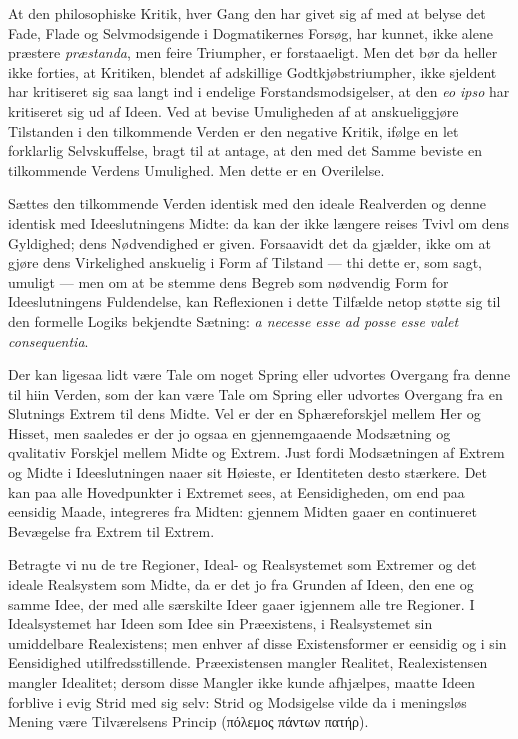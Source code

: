 \documentclass[12pt]{book}
\newcommand{\opage}[1]{\marginnote{\footnotesize\textit{[#1]}}}
\begin{document}
At den philosophiske Kritik, hver Gang den har givet sig af med at belyse det Fade, Flade og Selvmodsigende i Dogmatikernes Forsøg, har kunnet, ikke alene præstere \textit{præstanda}, men feire Triumpher, er forstaaeligt. Men det bør da heller ikke forties, at Kritiken, blendet af adskillige Godtkjøbstriumpher, ikke sjeldent har kritiseret sig saa langt ind i endelige Forstandsmodsigelser, at den \textit{eo ipso} har kritiseret sig ud af Ideen. Ved at bevise Umuligheden af at anskueliggjøre Tilstanden i den tilkommende Verden er den negative Kritik, ifølge en let forklarlig Selvskuffelse, bragt til at antage, at den med det Samme beviste en tilkommende Verdens Umulighed. Men dette er en Overilelse.

Sættes den tilkommende Verden identisk med den ideale Realverden og denne identisk med Ideeslutningens Midte: da kan der ikke længere reises Tvivl om dens Gyldighed; dens Nødvendighed er given. Forsaavidt det da gjælder, ikke om at gjøre dens Virkelighed anskuelig i Form af Tilstand --- thi dette er, som sagt, umuligt --- men om at be%
\opage{460}stemme dens Begreb som nødvendig Form for Ideeslutningens Fuldendelse, kan Reflexionen i dette Tilfælde netop støtte sig til den formelle Logiks bekjendte Sætning: \textit{a necesse esse ad posse esse valet consequentia}.

Der kan ligesaa lidt være Tale om noget Spring eller udvortes Overgang fra denne til hiin Verden, som der kan være Tale om Spring eller udvortes Overgang fra en Slutnings Extrem til dens Midte. Vel er der en Sphæreforskjel mellem Her og Hisset, men saaledes er der jo ogsaa en gjennemgaaende Modsætning og qvalitativ Forskjel mellem Midte og Extrem. Just fordi Modsætningen af Extrem og Midte i Ideeslutningen naaer sit Høieste, er Identiteten desto stærkere. Det kan paa alle Hovedpunkter i Extremet sees, at Eensidigheden, om end paa eensidig Maade, integreres fra Midten: gjennem Midten gaaer en continueret Bevægelse fra Extrem til Extrem.

Betragte vi nu de tre Regioner, Ideal- og Realsystemet som Extremer og det ideale Realsystem som Midte, da er det jo fra Grunden af Ideen, den ene og samme Idee, der med alle særskilte Ideer gaaer igjennem alle tre Regioner. I Idealsystemet har Ideen som Idee sin Præexistens, i Realsystemet sin umiddelbare Realexistens; men enhver af disse Existensformer er eensidig og i sin Eensidighed utilfredsstillende. Præexistensen mangler Realitet, Realexistensen mangler Idealitet; dersom disse Mangler ikke kunde afhjælpes, maatte Ideen forblive i evig Strid med sig selv: Strid og Modsigelse vilde da i meningsløs Mening være Tilværelsens Princip (πόλεμος πάντων πατήρ).
\end{document}
